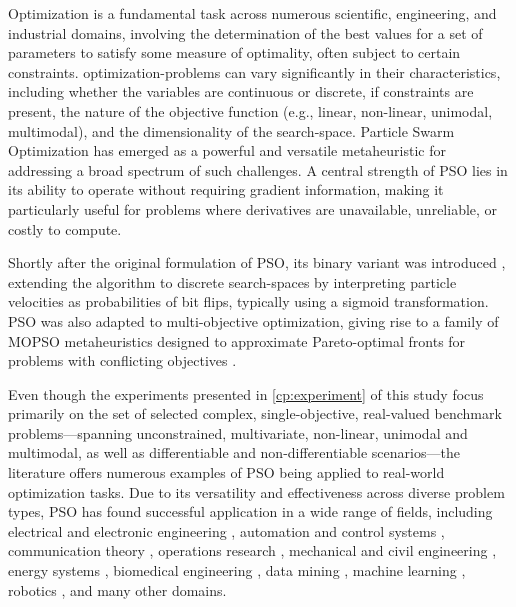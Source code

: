 {Optimization is a fundamental task across numerous scientific, engineering, and industrial domains, involving the determination of the best values for a set of parameters to satisfy some measure of optimality, often subject to certain constraints. \Glspl{optimization-problem}  can vary significantly in their characteristics, including whether the variables are continuous or discrete, if constraints are present, the nature of the objective function (e.g., linear, non-linear, unimodal, multimodal), and the dimensionality of the \gls{search-space}.
Particle Swarm Optimization has emerged as a powerful and versatile \gls{metaheuristic} for addressing a broad spectrum of such challenges. A central strength of PSO lies in its ability to operate without requiring gradient information, making it particularly useful for problems where derivatives are unavailable, unreliable, or costly to compute.

Shortly after the original formulation of PSO, its binary variant was introduced \citep{kennedy1997discrete}, extending  the algorithm to discrete \glspl{search-space} by interpreting particle velocities as probabilities of bit flips, typically using a sigmoid transformation. 
PSO was also adapted to multi-objective optimization, giving rise to a family of MOPSO \glspl{metaheuristic} designed to approximate Pareto-optimal fronts for problems with conflicting objectives \citep{alvarezbenitez2005mopso, nebro2009smpsomcdm, shao2025improved}.


Even though the experiments presented in \autoref{cp:experiment} of this study focus primarily on the set of selected complex, single-objective, real-valued benchmark problems—spanning unconstrained, multivariate, non-linear, unimodal and multimodal, as well as differentiable and non-differentiable scenarios---the literature offers numerous examples of PSO being applied to real-world optimization tasks. Due to its versatility and effectiveness across diverse problem types, PSO has found successful application in a wide range of fields, including
electrical and electronic engineering \citep[e.g.,][]{jin2024improved, salvatierra2024pso, dibya2025optimized},
automation and control systems \citep[e.g.,][]{duan2024using,urgan2024pso,gil2024platooning}, 
communication theory \citep[e.g.,][]{qiao2025resource,jin2024overview,jin2025design}, 
operations research \citep[e.g.,][]{li2025ore,omran2025empirical,dong2022optimized, palaniappan2025task, simaiya2024hybrid}, 
mechanical and civil engineering \citep[e.g.,][]{ramkumar2025intelligent,wang2025optimisation,houssein2025recent, hao2025composite}, 
energy systems \citep[e.g.,][]{bade2025multi,zhang2024energy,hamza2024optimization}, 
biomedical engineering \citep[e.g.,][]{mallik2024swarm}, 
data mining \citep[e.g.,][]{shan2024research,zuo2024knowledge,carstensen2025efficient}, 
machine learning \citep[e.g.,][]{alenezi2025hybrid,balavani2024enhanced,tijjani2024enhanced}, 
robotics \citep[e.g.,][]{sharma2025swarm,liu2025design,prakash2024swarm}, 
and many other domains. 





}
